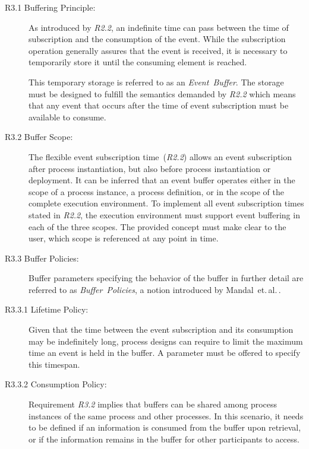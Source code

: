 \begin{description}
	\item[R3.1 Buffering Principle:]
	As introduced by \textit{R2.2}, an indefinite time can pass between the time of subscription and the consumption of the event.
	While the subscription operation generally assures that the event is received, it is necessary to temporarily store it until the consuming element is reached.
	
	This temporary storage is referred to as an \textit{Event~Buffer}.
	The storage must be designed to fulfill the semantics demanded by \textit{R2.2} which means that any event that occurs after the time of event subscription must be available to consume.
	
	\item[R3.2 Buffer Scope:]
	The flexible event subscription time~(\textit{R2.2}) allows an event subscription after process instantiation, but also before process instantiation or deployment.
	It can be inferred that an event buffer operates either in the scope of a process instance, a process definition, or in the scope of the complete execution environment.
	To implement all event subscription times stated in \textit{R2.2}, the execution environment must support event buffering in each of the three scopes. The provided concept must make clear to the user, which scope is referenced at any point in time.
	
	\item[R3.3 Buffer Policies:]
	Buffer parameters specifying the behavior of the buffer in further detail are referred to as \textit{Buffer~Policies}, a notion introduced by Mandal~et.\,al.\,\cite{mandal:2017}.
	
	\item[R3.3.1 Lifetime Policy:]
	Given that the time between the event subscription and its consumption may be indefinitely long, process designs can require to limit the maximum time an event is held in the buffer.
	A parameter must be offered to specify this timespan.
	
	\item[R3.3.2 Consumption Policy:]
	Requirement \textit{R3.2} implies that buffers can be shared among process instances of the same process and other processes.
	In this scenario, it needs to be defined if an information is consumed from the buffer upon retrieval, or if the information remains in the buffer for other participants to access. 
		

\end{description}
